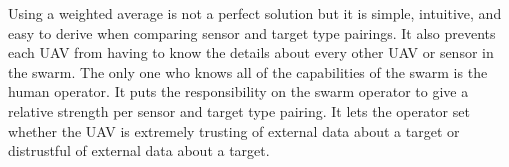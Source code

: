 




Using a weighted average is not a perfect solution but it is simple, intuitive, and easy to derive when comparing sensor and target type pairings.  It also prevents each UAV from having to know the details about every other UAV or sensor in the swarm.  The only one who knows all of the capabilities of the swarm is the human operator. It puts the responsibility on the swarm operator to give a relative strength per sensor and target type pairing.  It lets the operator set whether the UAV is extremely trusting of external data about a target or distrustful of external data about a target.

